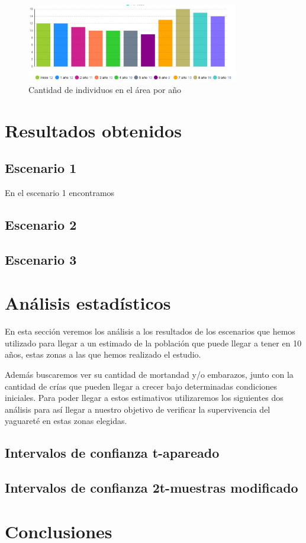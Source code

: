 \documentclass{article}
\begin{document}
    \begin{figure}
        \centering
        \includegraphics[width=350]{imagen4.jpg}
        \caption{Cantidad de individuos en el área por año}
        \label{fig:my_label}
    \end{figure}

\section{Resultados obtenidos}
    \subsection{Escenario 1}
        En el escenario 1 encontramos
    \subsection{Escenario 2}
    \subsection{Escenario 3}
        
\section{Análisis estadísticos}
    En esta sección veremos los análisis a los resultados de los escenarios que hemos utilizado para llegar
    a un estimado de la población que puede llegar a tener en 10 años, estas zonas a las que hemos realizado
    el estudio.

    Además buscaremos ver su cantidad de mortandad y/o embarazos, junto con la cantidad de crías que pueden
    llegar a crecer bajo determinadas condiciones iniciales. Para poder llegar a estos estimativos utilizaremos
    los siguientes dos análisis para así llegar a nuestro objetivo de verificar la supervivencia del yaguareté
    en estas zonas elegidas.


    \subsection{Intervalos de confianza t-apareado}



    \subsection{Intervalos de confianza 2t-muestras modificado}

        
        
\section{Conclusiones}
\end{document}

